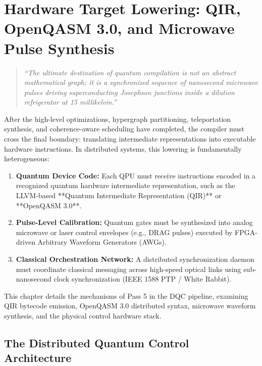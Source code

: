 \chapter{Hardware Target Lowering: QIR, OpenQASM 3.0, and Microwave Pulse Synthesis}
\label{ch:hardware_qir_openqasm}

\begin{quote}
\textit{``The ultimate destination of quantum compilation is not an abstract mathematical graph; it is a synchronized sequence of nanosecond microwave pulses driving superconducting Josephson junctions inside a dilution refrigerator at 15 millikelvin.''}
\end{quote}

After the high-level optimizations, hypergraph partitioning, teleportation synthesis, and coherence-aware scheduling have completed, the compiler must cross the final boundary: translating intermediate representations into executable hardware instructions. In distributed systems, this lowering is fundamentally heterogeneous:
\begin{enumerate}
    \item \textbf{Quantum Device Code:} Each QPU must receive instructions encoded in a recognized quantum hardware intermediate representation, such as the LLVM-based **Quantum Intermediate Representation (QIR)** or **OpenQASM 3.0**.
    \item \textbf{Pulse-Level Calibration:} Quantum gates must be synthesized into analog microwave or laser control envelopes (e.g., DRAG pulses) executed by FPGA-driven Arbitrary Waveform Generators (AWGs).
    \item \textbf{Classical Orchestration Network:} A distributed synchronization daemon must coordinate classical messaging across high-speed optical links using sub-nanosecond clock synchronization (IEEE 1588 PTP / White Rabbit).
\end{enumerate}

This chapter details the mechanisms of Pass 5 in the DQC pipeline, examining QIR bytecode emission, OpenQASM 3.0 distributed syntax, microwave waveform synthesis, and the physical control hardware stack.

\section{The Distributed Quantum Control Architecture}
\label{sec:hardware_control_stack}


